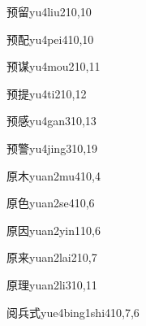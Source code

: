 \begin{verbete}{预留}{yu4liu2}{10,10}
\end{verbete}

\begin{verbete}{预配}{yu4pei4}{10,10}
\end{verbete}

\begin{verbete}{预谋}{yu4mou2}{10,11}
\end{verbete}

\begin{verbete}{预提}{yu4ti2}{10,12}
\end{verbete}

\begin{verbete}{预感}{yu4gan3}{10,13}
\end{verbete}

\begin{verbete}{预警}{yu4jing3}{10,19}
\end{verbete}

\begin{verbete}{原木}{yuan2mu4}{10,4}
\end{verbete}

\begin{verbete}{原色}{yuan2se4}{10,6}
\end{verbete}

\begin{verbete}{原因}{yuan2yin1}{10,6}
\end{verbete}

\begin{verbete}{原来}{yuan2lai2}{10,7}
\end{verbete}

\begin{verbete}{原理}{yuan2li3}{10,11}
\end{verbete}

\begin{verbete}{阅兵式}{yue4bing1shi4}{10,7,6}
\end{verbete}

